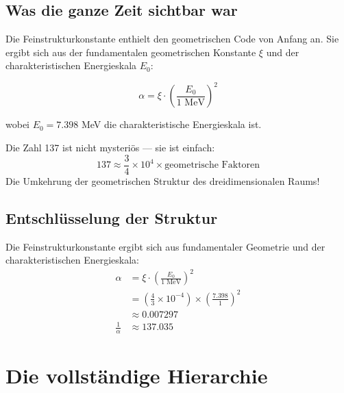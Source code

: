 	\subsection{Was die ganze Zeit sichtbar war}
	
	Die Feinstrukturkonstante enthielt den geometrischen Code von Anfang an. Sie ergibt sich aus der fundamentalen geometrischen Konstante $\xi$ und der charakteristischen Energieskala $E_0$:
	
	\begin{equation}
		\alpha = \xi \cdot \left(\frac{E_0}{1 \text{ MeV}}\right)^2
	\end{equation}
	
	wobei $E_0 = 7.398$ MeV die charakteristische Energieskala ist.
	
	\begin{tcolorbox}[colback=blue!5!white,colframe=blue!75!black,title=Erkenntnis]
		Die Zahl 137 ist nicht mysteriös — sie ist einfach:
		\begin{equation}
			137 \approx \frac{3}{4} \times 10^4 \times \text{geometrische Faktoren}
		\end{equation}
		Die Umkehrung der geometrischen Struktur des dreidimensionalen Raums!
	\end{tcolorbox}
	
	\subsection{Entschlüsselung der Struktur}
	
	\begin{tcolorbox}[colback=red!5!white,colframe=red!75!black,title=Die vollständige Entschlüsselung]
		Die Feinstrukturkonstante ergibt sich aus fundamentaler Geometrie und der charakteristischen Energieskala:
		\begin{align}
			\alpha &= \xi \cdot \left(\frac{E_0}{1 \text{ MeV}}\right)^2 \\
			&= \left(\frac{4}{3} \times 10^{-4}\right) \times \left(\frac{7.398}{1}\right)^2 \\
			&\approx 0.007297 \\
			\frac{1}{\alpha} &\approx 137.035
		\end{align}
	\end{tcolorbox}
	
	\section{Die vollständige Hierarchie}
	
